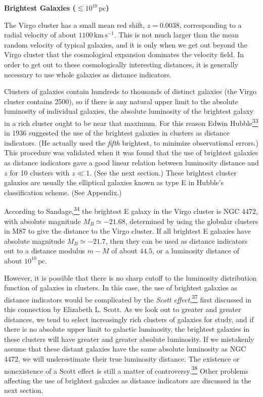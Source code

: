 

\medskip
\noindent\textbf{Brightest Galaxies (\(\lesssim10^{10}\,\mathrm{pc}\))}
\par\smallskip

The Virgo cluster has a small mean red shift, \(z=0.0038\), corresponding to
a radial velocity of about \(1100\,\mathrm{km\,s^{-1}}\). This is not much
larger than the mean random velocity of typical galaxies, and it is only when
we get out beyond the Virgo cluster that the cosmological expansion
dominates the velocity field. In order to get out to these cosmologically
interesting distances, it is generally necessary to use whole galaxies as
distance indicators.

Clusters of galaxies contain hundreds to thousands of distinct galaxies
(the Virgo cluster contains 2500), so if there is any natural upper limit to
the absolute luminosity of individual galaxies, the absolute luminosity of
the brightest galaxy in a rich cluster ought to be near that maximum. For
this reason Edwin Hubble\hyperref[ch14-ref-33]{\textsuperscript{33}} in 1936
suggested the use of the brightest galaxies in clusters as distance
indicators. (He actually used the \emph{fifth} brightest, to minimize
observational errors.) This procedure was validated when it was found that
the use of brightest galaxies as distance indicators gave a good linear
relation between luminosity distance and \(z\) for 10 clusters with
\(z\ll1\). (See the next section.) These brightest cluster galaxies are
usually the elliptical galaxies known as type E in Hubble's classification
scheme. (See Appendix.)

According to Sandage,\hyperref[ch14-ref-34]{\textsuperscript{34}} the
brightest E galaxy in the Virgo cluster is NGC 4472, with absolute magnitude
\(M_B\simeq-21.68\), determined by using the globular clusters in M87 to give
the distance to the Virgo cluster. If all brightest E galaxies have absolute
magnitude \(M_B\simeq-21.7\), then they can be used as distance indicators
out to a distance modulus \(m-M\) of about \(44.5\), or a luminosity
distance of about \(10^{10}\,\mathrm{pc}\).

However, it is possible that there is no sharp cutoff to the luminosity
distribution function of galaxies in clusters. In this case, the use of
brightest galaxies as distance indicators would be complicated by the
\emph{Scott effect},\hyperref[ch14-ref-37]{\textsuperscript{37}} first
discussed in this connection by Elizabeth L. Scott. As we look out to
greater and greater distances, we tend to select increasingly rich clusters
of galaxies for study, and if there is no absolute upper limit to galactic
luminosity, the brightest galaxies in these clusters will have greater and
greater absolute luminosity. If we mistakenly assume that these distant
galaxies have the same absolute luminosity as NGC 4472, we will underestimate
their true luminosity distance. The existence or nonexistence of a Scott
effect is still a matter of
controversy.\hyperref[ch14-ref-38]{\textsuperscript{38}} Other problems
affecting the use of brightest galaxies as distance indicators are discussed
in the next section.

